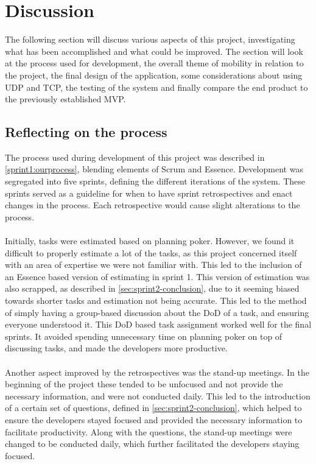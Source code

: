\section{Discussion}
The following section will discuss various aspects of this project, investigating what has been accomplished and what could be improved.
The section will look at the process used for development, the overall theme of mobility in relation to the project, the final design of the application, some considerations about using UDP and TCP, the testing of the system and finally compare the end product to the previously established MVP. 

\subsection{Reflecting on the process}
The process used during development of this project was described in \autoref{sprint1:ourprocess}, blending elements of Scrum and Essence.
Development was segregated into five sprints, defining the different iterations of the system.
These sprints served as a guideline for when to have sprint retrospectives and enact changes in the process.
Each retrospective would cause slight alterations to the process.
\\\\
Initially, tasks were estimated based on planning poker.
However, we found it difficult to properly estimate a lot of the tasks, as this project concerned itself with an area of expertise we were not familiar with.
This led to the inclusion of an Essence based version of estimating in sprint 1.
This version of estimation was also scrapped, as described in \autoref{sec:sprint2-conclusion}, due to it seeming biased towards shorter tasks and estimation not being accurate.
This led to the method of simply having a group-based discussion about the DoD of a task, and ensuring everyone understood it.
This DoD based task assignment worked well for the final sprints.
It avoided spending unnecessary time on planning poker on top of discussing tasks, and made the developers more productive.
\\\\
Another aspect improved by the retrospectives was the stand-up meetings.
In the beginning of the project these tended to be unfocused and not provide the necessary information, and were not conducted daily.
This led to the introduction of a certain set of questions, defined in \autoref{sec:sprint2-conclusion}, which helped to ensure the developers stayed focused and provided the necessary information to facilitate productivity.
Along with the questions, the stand-up meetings were changed to be conducted daily, which further facilitated the developers staying focused.
\\\\

